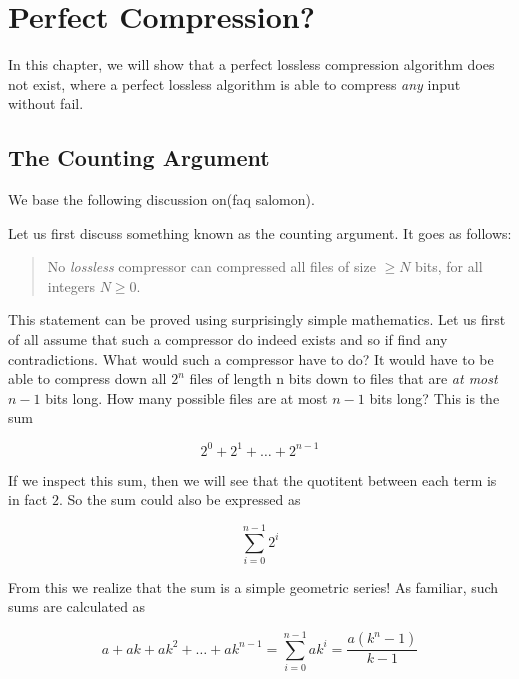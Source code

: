 \begin{comment}
  
\end{comment}

\chapter{Perfect Compression?}
\label{cha:perfect}

In this chapter, we will show that a perfect lossless compression algorithm does
not exist, where a perfect lossless algorithm is able to compress
\textit{any} input without fail.

\section{The Counting Argument}

We base the following discussion on(faq salomon).

Let us first discuss something known as the counting argument. It goes
as follows:

\begin{quote}
  No \textit{lossless} compressor can compressed all files of size
  $\ge N$ bits, for all integers $N \ge 0$.
\end{quote}

This statement can be proved using surprisingly simple
mathematics. Let us first of all assume that such a compressor do
indeed exists and so if find any contradictions. What would such a
compressor have to do? It would have to be able to compress down all
$2^n$ files of length n bits down to files that are \textit{at most}
$n-1$ bits long. How many possible files are at most $n-1$ bits long?
This is the sum

\begin{equation}
  \label{eq:n-minus-one}
  2^0 + 2^1 + \ldots + 2^{n-1}
\end{equation}

If we inspect this sum, then we will see that the quotitent between
each term is in fact $2$. So the sum could also be expressed as

\begin{equation*}
  \sum^{n-1}_{i = 0} 2^{i}
\end{equation*}

From this we realize that the sum is a simple geometric series! As
familiar, such sums are calculated as

\begin{equation}
  \label{eq:geometric-series}
  a + ak + ak^2 + \ldots + ak^{n-1} = \sum^{n-1}_{i = 0} ak^{i} =
  \frac{a(k^n - 1)}{k -1}
\end{equation}

